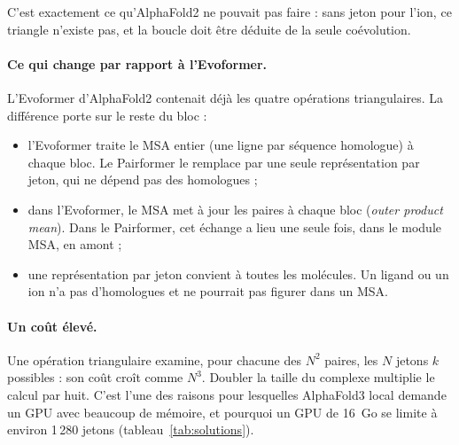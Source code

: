 C'est exactement ce qu'AlphaFold2 ne pouvait pas faire : sans jeton pour l'ion, ce triangle n'existe pas, et la boucle doit être déduite de la seule coévolution.

\paragraph{Ce qui change par rapport à l'Evoformer.} L'Evoformer d'AlphaFold2 contenait déjà les quatre opérations triangulaires. La différence porte sur le reste du bloc :
\begin{itemize}
  \item l'Evoformer traite le MSA entier (une ligne par séquence homologue) à chaque bloc. Le Pairformer le remplace par une seule représentation par jeton, qui ne dépend pas des homologues ;
  \item dans l'Evoformer, le MSA met à jour les paires à chaque bloc (\emph{outer product mean}). Dans le Pairformer, cet échange a lieu une seule fois, dans le module MSA, en amont ;
  \item une représentation par jeton convient à toutes les molécules. Un ligand ou un ion n'a pas d'homologues et ne pourrait pas figurer dans un MSA.
\end{itemize}

\paragraph{Un coût élevé.} Une opération triangulaire examine, pour chacune des $N^2$ paires, les $N$ jetons $k$ possibles : son coût croît comme $N^3$. Doubler la taille du complexe multiplie le calcul par huit. C'est l'une des raisons pour lesquelles AlphaFold3 local demande un GPU avec beaucoup de mémoire, et pourquoi un GPU de 16~Go se limite à environ 1\,280 jetons (tableau~\ref{tab:solutions}).
